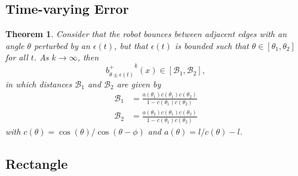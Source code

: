\documentclass[10pt,a4paper]{article}
\newtheorem{theorem}{\bf Theorem}
\begin{document}
\subsection{Time-varying Error}

\begin{theorem}
Consider that the robot bounces between adjacent edges with an angle $\theta$ perturbed by an $\epsilon(t)$, but that $\epsilon(t)$ is bounded such that $\theta \in [\theta_1,\theta_2]$ for all $t$. As $k \to \infty$, then 
\begin{equation*}
{b^+_{\theta\pm \epsilon(t)}}^k(x) \in [\mathcal{B}_1,\mathcal{B}_2],
\end{equation*}
 in which distances $\mathcal{B}_1$ and $\mathcal{B}_2$ are given by 
\begin{align}
\mathcal{B}_1 & = \frac{a(\theta_1) c(\theta_1)c(\theta_2)}{1- c(\theta_1)c(\theta_2) } \\
\mathcal{B}_2 & = \frac{a(\theta_2) c(\theta_1)c(\theta_2)}{1- c(\theta_1)c(\theta_2) }
\end{align} 
with $c(\theta)= \cos(\theta)/ \cos(\theta-\phi)$ and $a(\theta)=l/c(\theta) - l$. 
 
\end{theorem}



\subsection{Rectangle}
\end{document}
